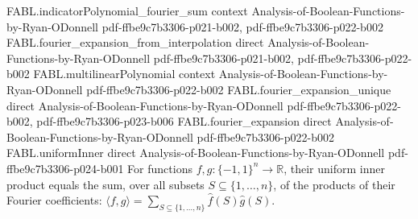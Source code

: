 \begin{theorem}
\proofstep
  {FABL.indicatorPolynomial_fourier_sum}
  {context}
  {Analysis-of-Boolean-Functions-by-Ryan-ODonnell}
  {pdf-ffbe9c7b3306-p021-b002,
    pdf-ffbe9c7b3306-p022-b002}
\proofstep
  {FABL.fourier_expansion_from_interpolation}
  {direct}
  {Analysis-of-Boolean-Functions-by-Ryan-ODonnell}
  {pdf-ffbe9c7b3306-p021-b002,
    pdf-ffbe9c7b3306-p022-b002}
\proofstep
  {FABL.multilinearPolynomial}
  {context}
  {Analysis-of-Boolean-Functions-by-Ryan-ODonnell}
  {pdf-ffbe9c7b3306-p022-b002}
\proofstep
  {FABL.fourier_expansion_unique}
  {direct}
  {Analysis-of-Boolean-Functions-by-Ryan-ODonnell}
  {pdf-ffbe9c7b3306-p022-b002,
    pdf-ffbe9c7b3306-p023-b006}
\proofstep
  {FABL.fourier_expansion}
  {direct}
  {Analysis-of-Boolean-Functions-by-Ryan-ODonnell}
  {pdf-ffbe9c7b3306-p022-b002}
\proofstep
  {FABL.uniformInner}
  {direct}
  {Analysis-of-Boolean-Functions-by-Ryan-ODonnell}
  {pdf-ffbe9c7b3306-p024-b001}
For functions $f,g:\{-1,1\}^n\to\mathbb{R}$, their uniform inner product equals the sum,
over all subsets $S\subseteq\{1,\ldots,n\}$, of the products of their Fourier
coefficients: $\langle f,g\rangle=\sum_{S\subseteq\{1,\ldots,n\}}\widehat f(S)\widehat
g(S)$.
\end{theorem}

